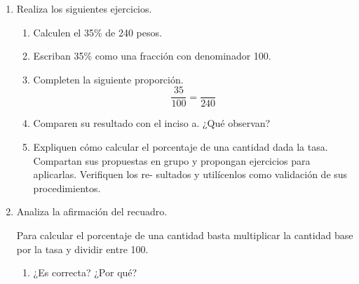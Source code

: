 \documentclass[11pt]{book}
\begin{document}
\begin{enumerate}
\begin{figure}[H]
          \label{fig:tabla_porciento}
        \end{figure}
  \item Realiza los siguientes ejercicios.
        \begin{enumerate}
          \item Calculen el 35\% de 240 pesos.
          \item Escriban 35\% como una fracción con denominador 100.
          \item Completen la siguiente proporción.
                \[\dfrac{35}{100} = \dfrac{}{240}\]
          \item Comparen su resultado con el inciso a. ¿Qué observan?
          \item Expliquen cómo calcular el porcentaje de una cantidad dada la tasa. Compartan
                sus propuestas en grupo y propongan ejercicios para aplicarlas. Verifiquen los re-
                sultados y utilícenlos como validación de sus procedimientos.
        \end{enumerate}
  \item Analiza la afirmación del recuadro.
        \begin{boxH}
          Para calcular el porcentaje de una cantidad basta multiplicar la cantidad base por
          la tasa y dividir entre 100.
        \end{boxH}
        \begin{enumerate}
          \item ¿Es correcta? ¿Por qué?
        \end{enumerate}
\end{enumerate}
\end{document}
